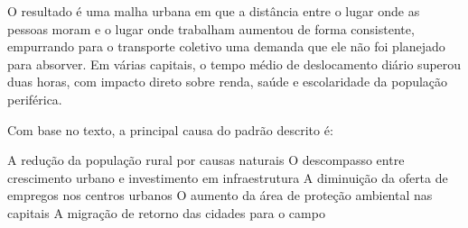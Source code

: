 O resultado é uma malha urbana em que a distância entre o lugar onde as
pessoas moram e o lugar onde trabalham aumentou de forma consistente,
empurrando para o transporte coletivo uma demanda que ele não foi
planejado para absorver. Em várias capitais, o tempo médio de deslocamento
diário superou duas horas, com impacto direto sobre renda, saúde e
escolaridade da população periférica.

Com base no texto, a principal causa do padrão descrito é:
\begin{choices}
  \choice A redução da população rural por causas naturais
  \CorrectChoice O descompasso entre crescimento urbano e investimento em infraestrutura
  \choice A diminuição da oferta de empregos nos centros urbanos
  \choice O aumento da área de proteção ambiental nas capitais
  \choice A migração de retorno das cidades para o campo
\end{choices}
